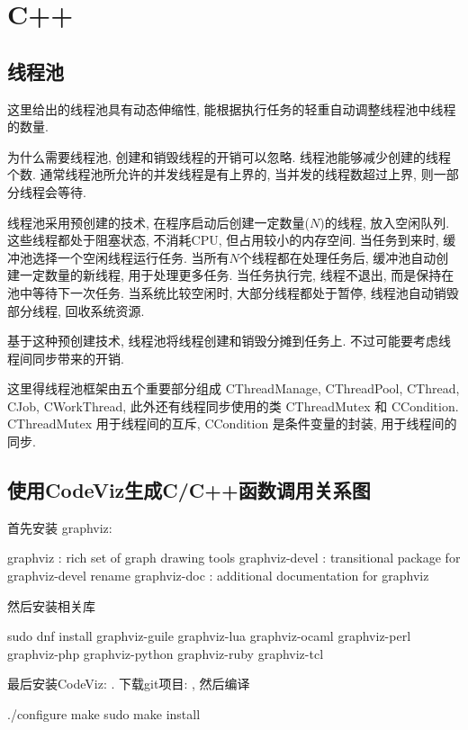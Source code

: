 \chapter{C++}
\section{线程池}
这里给出的线程池具有动态伸缩性, 能根据执行任务的轻重自动调整线程池中线程的数量.

为什么需要线程池, 创建和销毁线程的开销可以忽略. 线程池能够减少创建的线程个数. 
通常线程池所允许的并发线程是有上界的, 当并发的线程数超过上界, 则一部分线程会等待.

线程池采用预创建的技术, 在程序启动后创建一定数量($N$)的线程, 放入空闲队列. 
这些线程都处于阻塞状态, 不消耗CPU, 但占用较小的内存空间. 当任务到来时, 
缓冲池选择一个空闲线程运行任务. 当所有$N$个线程都在处理任务后, 
缓冲池自动创建一定数量的新线程, 用于处理更多任务. 当任务执行完, 线程不退出,
而是保持在池中等待下一次任务. 当系统比较空闲时, 大部分线程都处于暂停, 线程池自动销毁部分线程,
回收系统资源.

基于这种预创建技术, 线程池将线程创建和销毁分摊到任务上. 不过可能要考虑线程间同步带来的开销.

这里得线程池框架由五个重要部分组成 CThreadManage, CThreadPool, CThread, CJob, 
CWorkThread, 此外还有线程同步使用的类 CThreadMutex 和 CCondition.
CThreadMutex 用于线程间的互斥, CCondition 是条件变量的封装, 用于线程间的同步.
\section{使用CodeViz生成C/C++函数调用关系图}
首先安装 graphviz: 

\begin{shell}
 graphviz : rich set of graph drawing tools
 graphviz-devel : transitional package for graphviz-devel rename
 graphviz-doc : additional documentation for graphviz
\end{shell}
然后安装相关库
\begin{shell}
sudo dnf install graphviz-guile graphviz-lua graphviz-ocaml graphviz-perl graphviz-php graphviz-python graphviz-ruby graphviz-tcl
\end{shell}
最后安装CodeViz: . 下载git项目: , 
然后编译
\begin{shell}
 ./configure
 make
 sudo make install
\end{shell}


